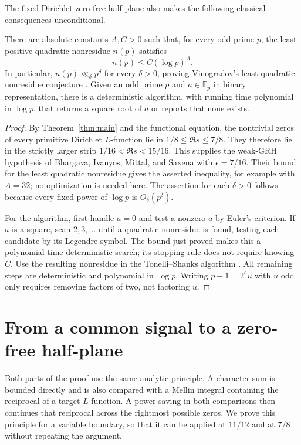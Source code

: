 The fixed Dirichlet zero-free half-plane also makes the following
classical consequences unconditional.

\begin{corollary}\label{cor:nonresidues-square-roots}
There are absolute constants $A,C>0$ such that, for every odd prime $p$,
the least positive quadratic nonresidue $n(p)$ satisfies
\[
 n(p)\le C(\log p)^A.
\]
In particular, $n(p)\ll_\delta p^\delta$ for every $\delta>0$, proving
Vinogradov's least quadratic nonresidue conjecture
\cite[Conjecture 1.1]{TaoNonresidues}.
Given an odd prime $p$ and $a\in\mathbb F_p$ in binary representation,
there is a deterministic algorithm, with running time polynomial in
$\log p$, that returns a square root of $a$ or reports that none exists.
\end{corollary}

\begin{proof}
By Theorem~\ref{thm:main} and the functional equation, the nontrivial
zeros of every primitive Dirichlet $L$-function lie in
$1/8\le\Re s\le7/8$. They therefore lie in the strictly larger strip
$1/16<\Re s<15/16$. This supplies the weak-GRH hypothesis of
Bhargava, Ivanyos, Mittal, and Saxena
\cite[Conjecture 6.3 and Theorem 6.7]{BIMS} with $\epsilon=7/16$.
Their bound for the least quadratic nonresidue gives the asserted
inequality, for example with $A=32$; no optimization is needed here.
The assertion for each $\delta>0$ follows because every fixed power
of $\log p$ is $O_\delta(p^\delta)$.

For the algorithm, first handle $a=0$ and test a nonzero $a$ by Euler's
criterion. If $a$ is a square, scan $2,3,\ldots$ until a quadratic
nonresidue is found, testing each candidate by its Legendre symbol.
The bound just proved makes this a polynomial-time deterministic
search; its stopping rule does not require knowing $C$.
Use the resulting nonresidue in the Tonelli--Shanks algorithm
\cite[Section 2.9, Algorithm 3 and Lemma 2.9.5]{Galbraith}.
All remaining steps are deterministic and polynomial in $\log p$.
Writing $p-1=2^e u$ with $u$ odd only requires removing factors of two,
not factoring $u$.
\end{proof}

\section{From a common signal to a zero-free half-plane}
\label{sec:analytic-reduction}

Both parts of the proof use the same analytic principle. A character sum
is bounded directly and is also compared with a Mellin integral containing
the reciprocal of a target $L$-function. A power saving in both comparisons
then continues that reciprocal across the rightmost possible zeros. We prove
this principle for a variable boundary, so that it can be applied at
$11/12$ and at $7/8$ without repeating the argument.

